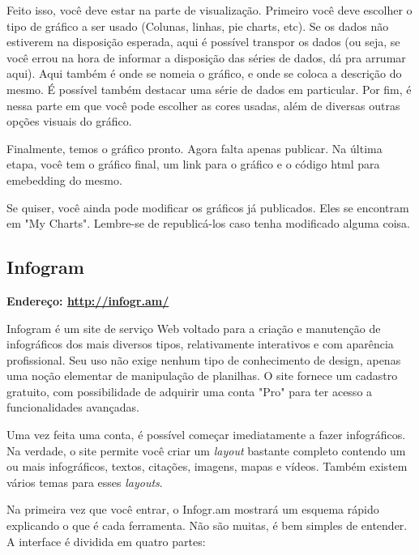 \documentclass[12pt,onecolumn]{article}
\begin{document}
    Feito isso, você deve estar na parte de visualização. Primeiro você deve escolher
    o tipo de gráfico a ser usado (Colunas, linhas, pie charts, etc). Se os dados não
    estiverem na disposição esperada, aqui é possível transpor os dados (ou seja, se
    você errou na hora de informar a disposição das séries de dados, dá pra arrumar 
    aqui). Aqui também é onde se nomeia o gráfico, e onde se coloca a descrição do
    mesmo. É possível também destacar uma série de dados em particular. Por fim, 
    é nessa parte em que você pode escolher as cores usadas, além de diversas outras
    opções visuais do gráfico.
    
    Finalmente, temos o gráfico pronto. Agora falta apenas publicar. Na última etapa,
    você tem o gráfico final, um link para o gráfico e o código html para emebedding
    do mesmo.
    
    Se quiser, você ainda pode modificar os gráficos já publicados. Eles se encontram
    em "My Charts". Lembre-se de republicá-los caso tenha modificado alguma coisa.

  \subsection{Infogram}
    \textbf{Endereço: \url{http://infogr.am/}}
    
    Infogram é um site de serviço Web voltado para a criação e manutenção de
    infográficos dos mais diversos tipos, relativamente interativos e com
    aparência profissional. Seu uso não exige nenhum tipo de conhecimento de
    design, apenas uma noção elementar de manipulação de planilhas. O site fornece
    um cadastro gratuito, com possibilidade de adquirir uma conta "Pro" para ter
    acesso a funcionalidades avançadas.
    
    Uma vez feita uma conta, é possível começar imediatamente a fazer
    infográficos. Na verdade, o site permite você criar um \textit{layout}
    bastante completo contendo um ou mais infográficos, textos, citações, imagens,
    mapas e vídeos. Também existem vários temas para esses \textit{layouts}.
    
    Na primeira vez que você entrar, o Infogr.am mostrará um esquema rápido
    explicando o que é cada ferramenta. Não são muitas, é bem simples de entender.
    A interface é dividida em quatro partes:
    
\end{document}
